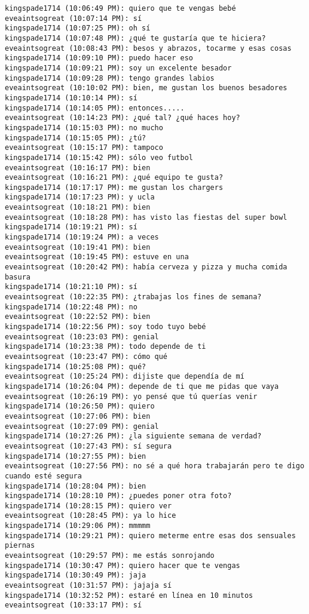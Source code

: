 \begin{verbatim}
kingspade1714 (10:06:49 PM): quiero que te vengas bebé
eveaintsogreat (10:07:14 PM): sí
kingspade1714 (10:07:25 PM): oh sí
kingspade1714 (10:07:48 PM): ¿qué te gustaría que te hiciera?
eveaintsogreat (10:08:43 PM): besos y abrazos, tocarme y esas cosas
kingspade1714 (10:09:10 PM): puedo hacer eso
kingspade1714 (10:09:21 PM): soy un excelente besador
kingspade1714 (10:09:28 PM): tengo grandes labios
eveaintsogreat (10:10:02 PM): bien, me gustan los buenos besadores
kingspade1714 (10:10:14 PM): sí
kingspade1714 (10:14:05 PM): entonces.....
eveaintsogreat (10:14:23 PM): ¿qué tal? ¿qué haces hoy?
kingspade1714 (10:15:03 PM): no mucho
kingspade1714 (10:15:05 PM): ¿tú?
eveaintsogreat (10:15:17 PM): tampoco
kingspade1714 (10:15:42 PM): sólo veo futbol
eveaintsogreat (10:16:17 PM): bien
eveaintsogreat (10:16:21 PM): ¿qué equipo te gusta?
kingspade1714 (10:17:17 PM): me gustan los chargers
kingspade1714 (10:17:23 PM): y ucla
eveaintsogreat (10:18:21 PM): bien
eveaintsogreat (10:18:28 PM): has visto las fiestas del super bowl
kingspade1714 (10:19:21 PM): sí
kingspade1714 (10:19:24 PM): a veces
eveaintsogreat (10:19:41 PM): bien
eveaintsogreat (10:19:45 PM): estuve en una
eveaintsogreat (10:20:42 PM): había cerveza y pizza y mucha comida basura
kingspade1714 (10:21:10 PM): sí
eveaintsogreat (10:22:35 PM): ¿trabajas los fines de semana?
kingspade1714 (10:22:48 PM): no
eveaintsogreat (10:22:52 PM): bien 
kingspade1714 (10:22:56 PM): soy todo tuyo bebé
eveaintsogreat (10:23:03 PM): genial
kingspade1714 (10:23:38 PM): todo depende de ti
eveaintsogreat (10:23:47 PM): cómo qué
kingspade1714 (10:25:08 PM): qué?
eveaintsogreat (10:25:24 PM): dijiste que dependía de mí
kingspade1714 (10:26:04 PM): depende de ti que me pidas que vaya
eveaintsogreat (10:26:19 PM): yo pensé que tú querías venir
kingspade1714 (10:26:50 PM): quiero
eveaintsogreat (10:27:06 PM): bien
eveaintsogreat (10:27:09 PM): genial
kingspade1714 (10:27:26 PM): ¿la siguiente semana de verdad?
eveaintsogreat (10:27:43 PM): sí segura
kingspade1714 (10:27:55 PM): bien
eveaintsogreat (10:27:56 PM): no sé a qué hora trabajarán pero te digo cuando esté segura
kingspade1714 (10:28:04 PM): bien
kingspade1714 (10:28:10 PM): ¿puedes poner otra foto?
kingspade1714 (10:28:15 PM): quiero ver
eveaintsogreat (10:28:45 PM): ya lo hice
kingspade1714 (10:29:06 PM): mmmmm
kingspade1714 (10:29:21 PM): quiero meterme entre esas dos sensuales piernas
eveaintsogreat (10:29:57 PM): me estás sonrojando
kingspade1714 (10:30:47 PM): quiero hacer que te vengas
kingspade1714 (10:30:49 PM): jaja
eveaintsogreat (10:31:57 PM): jajaja sí
kingspade1714 (10:32:52 PM): estaré en línea en 10 minutos
eveaintsogreat (10:33:17 PM): sí

\end{verbatim}







